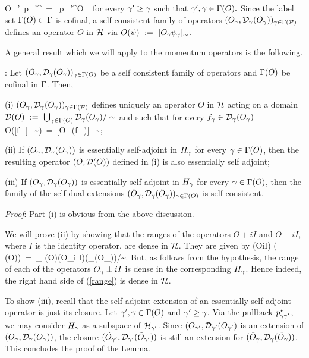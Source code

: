 \be \label{02}
O_{\g'}\circ\ p_{\g\g'}^\star \  = \ p_{\g\g'}^\star\circ O_\g
\ee
for every $\gamma'\ge\gamma$ such that $\gamma',\gamma\in\Gamma(O).$ Since the label set
$\Gamma(O)\subset \Gamma$ is cofinal, a self consistent family
of operators $(O_\gamma, {\cal D}_{\gamma}(O_\gamma))_{\gamma \in\Gamma({\cal P})}$ defines an
operator $O$ in ${\cal H}$ via $O(\psi)\ :=\ [O_\gamma \psi_\gamma]_\sim$.

A general result which we will apply to the momentum operators 
is the following.

\begin{lemma}{\rm :} \label{selfadjointness}
Let $(O_\gamma, {\cal D}_{\gamma}(O_\gamma))_{\gamma\in\Gamma(O)}$ be a self consistent family
of operators and $\Gamma(O)$ be cofinal in $\Gamma$. Then,

\noindent(i) $(O_\gamma, {\cal D}_{\gamma}(O_\gamma))_{\gamma\in\Gamma({\cal P})}$ defines
uniquely an operator $O$ in ${\cal H}$ acting on a domain ${\cal D}(O) \ :=\
\bigcup_{\gamma\in\Gamma(O)}{{\cal D}_\gamma(O_\gamma)}/\sim$ and such that for every
$f_\gamma\in{\cal D}_\gamma(O_\gamma)$
\be
O([f_\g]_\sim)\ =\ [O_\g(f_\g)]_\sim;
\ee

\noindent(ii) If $(O_\gamma, {\cal D}_\gamma(O_\gamma))$ is essentially self-adjoint 
in $H_\gamma$ for every $\gamma\in \Gamma(O)$, then the resulting operator $(O,
{\cal D}(O))$ defined in (i) is also essentially self adjoint;

\noindent(iii) If $(O_\gamma, {\cal D}_\gamma(O_\gamma))$ is essentially 
self-adjoint in $H_\gamma$ for every $\gamma\in \Gamma(O)$, then the family of
the self dual extensions $({\tilde O}_\gamma, {\cal D}_\gamma({\tilde 
O}_\gamma))_{\gamma\in\Gamma(O)}$ is self consistent.
\end{lemma}
\bigskip
{\it Proof}{\rm :} Part (i) is obvious from the above discussion. 

We will prove (ii) by showing that the ranges of the operators $O+iI$
and $O-iI$, where $I$ is the identity operator, are dense in ${\cal H}$.
They are given by
\be \label{range}
(O\pm iI) ( \D(O))\ =\  \bigcup_{\g\in
\Ga(O)}(O_\g\pm i I)(\D_\g(O_\g))/\sim.
\ee
But, as follows from the hypothesis, the range of each of the
operators $O_\gamma\pm i I$ is dense in the corresponding $H_\gamma$. Hence
indeed, the right hand side of (\ref{range}) is dense in ${\cal H}$.

To show (iii), recall that the self-adjoint extension of an
essentially self-adjoint operator is just its closure.  Let
$\gamma',\gamma\in\Gamma(O)$ and $\gamma'\ge\gamma$. Via the pullback $p_{\gamma\gamma'}^\star$,
we may consider $H_{\gamma}$ as a subspace of ${\cal H}_{\gamma'}$. Since
$(O_{\gamma'},{\cal D}_{\gamma'}(O_{\gamma'})$ is an extension of $(O_\gamma,
{\cal D}_{\gamma}(O_{\gamma}))$, the closure $({\tilde O}_{\gamma'}, {\cal D}_{\gamma'}
({\tilde O}_{\gamma'}))$ is still an extension for $({\tilde O}_{\gamma},
{\cal D}_{\gamma}({\tilde O}_{\gamma}))$. This concludes the proof of the Lemma.

